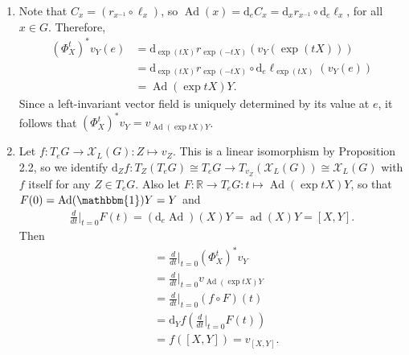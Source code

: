 \documentclass{article}
\newcommand{\bb}{\mathbb}
\theoremstyle{remark}
\renewcommand{\d}{\mathrm{d}}
\DeclareMathOperator{\Ad}{Ad}
\DeclareMathOperator{\ad}{ad}
\begin{document}
\begin{enumerate}[label=(\roman*)]
    \item Note that $C_x = (r_{x^{-1}} \circ \ell_x)$, so $\Ad(x) = \d_eC_x = \d_xr_{x^{-1}} \circ \d_e\ell_x$, for all $x \in G$. Therefore,
    \begin{align*}
        (\Phi^t_X)^* v_Y(e) &= \d_{\exp(tX)} r_{\exp(-tX)} (v_Y(\exp(tX))) \\
        &= \d_{\exp(tX)} r_{\exp(-tX)} \circ \d_e \ell_{\exp(tX)} (v_Y(e)) \\
        &= \Ad(\exp tX) Y.
    \end{align*}
    Since a left-invariant vector field is uniquely determined by its value at $e$, it follows that $(\Phi^t_X)^* v_Y = v_{\Ad(\exp tX) Y}$.

    \item Let $f : T_eG \to \mathcal{X}_L(G) : Z \mapsto v_Z$. This is a linear isomorphism by Proposition 2.2, so we identify $\d_Z f : T_Z(T_eG) \cong T_eG \to T_{v_Z}(\mathcal{X}_L(G)) \cong \mathcal{X}_L(G)$ with $f$ itself for any $Z \in T_eG$. Also let $F : \bb{R} \to T_eG : t \mapsto \Ad(\exp tX) Y$, so that $F(0) = \Ad(\mathbbm{1})Y = Y$ and
    \begin{align*}
        \frac{d}{dt}\bigg|_{t=0} F(t) = (\d_e \Ad)(X) Y = \ad(X) Y = [X,Y].
    \end{align*}
    Then 
    \begin{align*}
        [v_X, v_Y] &= \frac{d}{dt}\bigg|_{t=0} (\Phi^t_X)^* v_Y \\
        &= \frac{d}{dt}\bigg|_{t=0} v_{\Ad(\exp tX) Y} \\
        &= \frac{d}{dt}\bigg|_{t=0} (f \circ F)(t) \\
        &= \d_Y f \left( \frac{d}{dt}\bigg|_{t=0} F(t)\right) \\
        &= f([X,Y]) = v_{[X,Y]}.
    \end{align*}
\end{enumerate}
\end{document}

